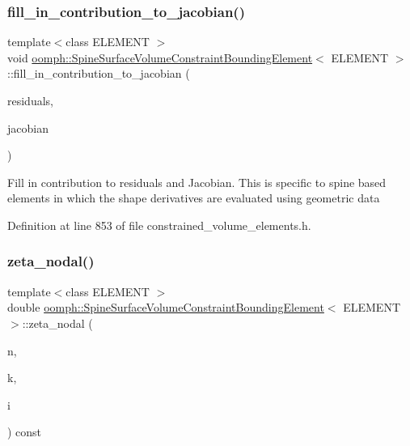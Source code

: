 \subsubsection{\texorpdfstring{fill\+\_\+in\+\_\+contribution\+\_\+to\+\_\+jacobian()}{fill\_in\_contribution\_to\_jacobian()}}
{\footnotesize\ttfamily template$<$class E\+L\+E\+M\+E\+NT $>$ \\
void \hyperlink{classoomph_1_1SpineSurfaceVolumeConstraintBoundingElement}{oomph\+::\+Spine\+Surface\+Volume\+Constraint\+Bounding\+Element}$<$ E\+L\+E\+M\+E\+NT $>$\+::fill\+\_\+in\+\_\+contribution\+\_\+to\+\_\+jacobian (\begin{DoxyParamCaption}\item[{Vector$<$ double $>$ \&}]{residuals,  }\item[{Dense\+Matrix$<$ double $>$ \&}]{jacobian }\end{DoxyParamCaption})\hspace{0.3cm}{\ttfamily [inline]}}

Fill in contribution to residuals and Jacobian. This is specific to spine based elements in which the shape derivatives are evaluated using geometric data 

Definition at line 853 of file constrained\+\_\+volume\+\_\+elements.\+h.

\mbox{\label{classoomph_1_1SpineSurfaceVolumeConstraintBoundingElement_aa252629ad8c455a83b5f2e9643a36e94}} 
\subsubsection{\texorpdfstring{zeta\+\_\+nodal()}{zeta\_nodal()}}
{\footnotesize\ttfamily template$<$class E\+L\+E\+M\+E\+NT $>$ \\
double \hyperlink{classoomph_1_1SpineSurfaceVolumeConstraintBoundingElement}{oomph\+::\+Spine\+Surface\+Volume\+Constraint\+Bounding\+Element}$<$ E\+L\+E\+M\+E\+NT $>$\+::zeta\+\_\+nodal (\begin{DoxyParamCaption}\item[{const unsigned \&}]{n,  }\item[{const unsigned \&}]{k,  }\item[{const unsigned \&}]{i }\end{DoxyParamCaption}) const\hspace{0.3cm}{\ttfamily [inline]}}



